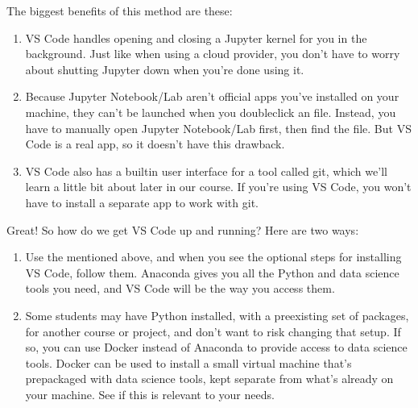 \documentclass[letterpaper,10pt,english]{jupyterBook}
\begin{document}
\sphinxAtStartPar
The biggest benefits of this method are these:
\begin{enumerate}
%
\item {} 
\sphinxAtStartPar
VS Code handles opening and closing a Jupyter kernel for you in the background.  Just like when using a cloud provider, you don’t have to worry about shutting Jupyter down when you’re done using it.

\item {} 
\sphinxAtStartPar
Because Jupyter Notebook/Lab aren’t official apps you’ve installed on your machine, they can’t be launched when you double\sphinxhyphen{}click an  file.  Instead, you have to manually open Jupyter Notebook/Lab first, then find the file.  But VS Code is a real app, so it doesn’t have this drawback.

\item {} 
\sphinxAtStartPar
VS Code also has a built\sphinxhyphen{}in user interface for a tool called git, which we’ll learn a little bit about later in our course.  If you’re using VS Code, you won’t have to install a separate app to work with git.

\end{enumerate}

\sphinxAtStartPar
Great!  So how do we get VS Code up and running?  Here are two ways:
\begin{enumerate}
%
\item {} 
\sphinxAtStartPar
{} Use the {\hyperref[\detokenize{anaconda-installation::doc}]{}} mentioned above, and when you see the optional steps for installing VS Code, follow them.  Anaconda gives you all the Python and data science tools you need, and VS Code will be the way you access them.

\item {} 
\sphinxAtStartPar
{}  Some students may have Python installed, with a pre\sphinxhyphen{}existing set of packages, for another course or project, and don’t want to risk changing that setup.  If so, you can use Docker instead of Anaconda to provide access to data science tools.  Docker can be used to install a small virtual machine that’s pre\sphinxhyphen{}packaged with data science tools, kept separate from what’s already on your machine.  See  if this is relevant to your needs.

\end{enumerate}
\end{document}
